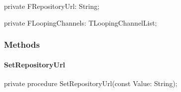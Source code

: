\documentclass{report}
\newif\ifpdf
\begin{document}
\begin{list}{}
\par  \label{ok_nested_1.TRepoSoundEngine-FRepositoryUrl}
\item[\textbf{FRepositoryUrl}\hfill]
\ifpdf
\begin{flushleft}
\fi
\begin{ttfamily}
private FRepositoryUrl: String;\end{ttfamily}

\ifpdf
\end{flushleft}
\fi


\par  \label{ok_nested_1.TRepoSoundEngine-FLoopingChannels}
\item[\textbf{FLoopingChannels}\hfill]
\ifpdf
\begin{flushleft}
\fi
\begin{ttfamily}
private FLoopingChannels: TLoopingChannelList;\end{ttfamily}

\ifpdf
\end{flushleft}
\fi


\par  \end{list}
\subsubsection*{\large{\textbf{Methods}}\normalsize\hspace{1ex}\hfill}
\paragraph*{SetRepositoryUrl}\hspace*{\fill}

\label{ok_nested_1.TRepoSoundEngine-SetRepositoryUrl}
\begin{list}{}{
\setlength{\itemindent}{0cm}
\setlength{\listparindent}{0cm}
\setlength{\leftmargin}{\evensidemargin}
\addtolength{\leftmargin}{\tmplength}
\settowidth{\labelsep}{X}
\addtolength{\leftmargin}{\labelsep}
\setlength{\labelwidth}{\tmplength}
}
\item[\textbf{Declaration}\hfill]
\ifpdf
\begin{flushleft}
\fi
\begin{ttfamily}
private procedure SetRepositoryUrl(const Value: String);\end{ttfamily}

\ifpdf
\end{flushleft}
\fi

\end{list}
\end{document}
